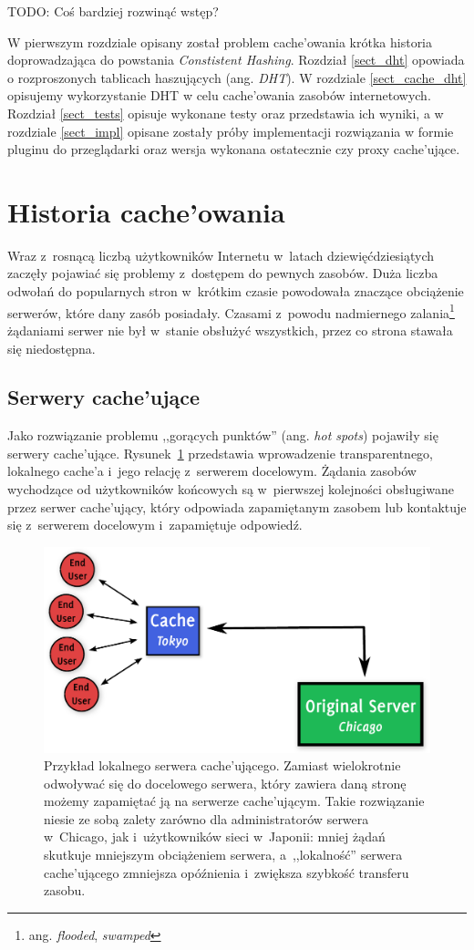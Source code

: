 \documentclass[a4paper,11pt]{scrartcl}
\newcommand{\s}{ }
\newcommand{\kesza}{cache'a}
\newcommand{\keszujace}{cache'ujące}
\newcommand{\keszujacego}{cache'ującego}
\newcommand{\keszujacy}{cache'ujący}
\newcommand{\keszujacym}{cache'ującym}
\newcommand{\keszowania}{cache'owania}
\begin{document}
TODO: Coś bardziej rozwinąć wstęp?

W pierwszym rozdziale opisany został problem \keszowania\s krótka historia doprowadzająca do powstania \textit{Constistent Hashing}. Rozdział \ref{sect_dht} opowiada o rozproszonych tablicach haszujących (ang. \textit{DHT}). W rozdziale \ref{sect_cache_dht} opisujemy wykorzystanie DHT w celu \keszowania\s zasobów internetowych. Rozdział \ref{sect_tests} opisuje wykonane testy oraz przedstawia ich wyniki, a w rozdziale \ref{sect_impl} opisane zostały próby implementacji rozwiązania w formie pluginu do przeglądarki oraz wersja wykonana ostatecznie czy proxy \keszujace.

\section{Historia \keszowania}
Wraz z~rosnącą liczbą użytkowników Internetu w~latach dziewięćdziesiątych zaczęły pojawiać się problemy z~dostępem do pewnych zasobów.
Duża liczba odwołań do popularnych stron w~krótkim czasie powodowała znaczące obciążenie serwerów, które dany zasób posiadały.
Czasami z~powodu nadmiernego zalania\footnote{ang. \textit{flooded}, \textit{swamped}} żądaniami serwer nie był w~stanie obsłużyć wszystkich, przez co strona stawała się niedostępna.

\subsection{Serwery \keszujace}\label{sect_cache}
Jako rozwiązanie problemu ,,gorących punktów'' (ang. \textit{hot spots}) pojawiły się serwery \keszujace. Rysunek~\ref{fig_cache_server} przedstawia wprowadzenie transparentnego, lokalnego \kesza\s i~jego relację z~serwerem docelowym. 
Żądania zasobów wychodzące od użytkowników końcowych są w~pierwszej kolejności obsługiwane przez serwer \keszujacy, który odpowiada zapamiętanym zasobem lub kontaktuje się z~serwerem docelowym i~zapamiętuje odpowiedź.

\begin{figure}[ht]
\centering
\includegraphics[width=0.85\linewidth]{img/cache.pdf}
\caption{
Przykład lokalnego serwera \keszujacego.
Zamiast wielokrotnie odwoływać się do docelowego serwera, który zawiera daną stronę
możemy zapamiętać ją na serwerze \keszujacym. Takie rozwiązanie niesie ze sobą zalety
zarówno dla administratorów serwera w~Chicago, jak i~użytkowników sieci w~Japonii:
mniej żądań skutkuje mniejszym obciążeniem serwera, a~,,lokalność'' serwera \keszujacego\s zmniejsza opóźnienia i~zwiększa szybkość transferu zasobu.
}
\label{fig_cache_server}
\end{figure}
\end{document}
